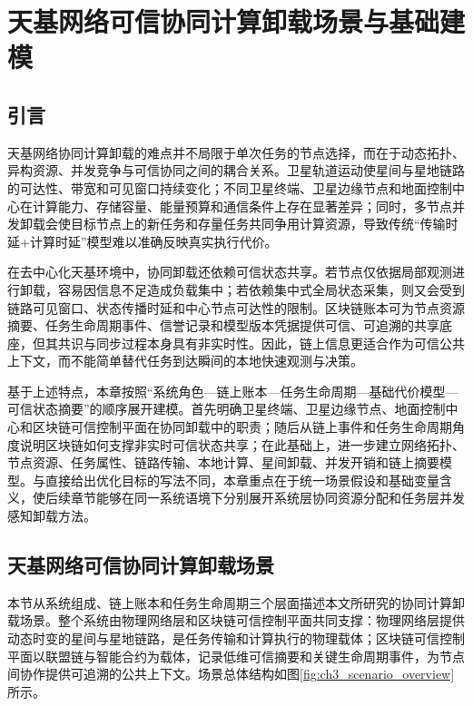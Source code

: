 
\chapter{天基网络可信协同计算卸载场景与基础建模}
\label{chap:ch3_unified_model}

\section{引言}
\label{sec:ch3_intro}

天基网络协同计算卸载的难点并不局限于单次任务的节点选择，而在于动态拓扑、异构资源、并发竞争与可信协同之间的耦合关系。卫星轨道运动使星间与星地链路的可达性、带宽和可见窗口持续变化；不同卫星终端、卫星边缘节点和地面控制中心在计算能力、存储容量、能量预算和通信条件上存在显著差异；同时，多节点并发卸载会使目标节点上的新任务和存量任务共同争用计算资源，导致传统``传输时延+计算时延''模型难以准确反映真实执行代价。

在去中心化天基环境中，协同卸载还依赖可信状态共享。若节点仅依据局部观测进行卸载，容易因信息不足造成负载集中；若依赖集中式全局状态采集，则又会受到链路可见窗口、状态传播时延和中心节点可达性的限制。区块链账本可为节点资源摘要、任务生命周期事件、信誉记录和模型版本凭据提供可信、可追溯的共享底座，但其共识与同步过程本身具有非实时性。因此，链上信息更适合作为可信公共上下文，而不能简单替代任务到达瞬间的本地快速观测与决策。

基于上述特点，本章按照``系统角色—链上账本—任务生命周期—基础代价模型—可信状态摘要''的顺序展开建模。首先明确卫星终端、卫星边缘节点、地面控制中心和区块链可信控制平面在协同卸载中的职责；随后从链上事件和任务生命周期角度说明区块链如何支撑非实时可信状态共享；在此基础上，进一步建立网络拓扑、节点资源、任务属性、链路传输、本地计算、星间卸载、并发开销和链上摘要模型。与直接给出优化目标的写法不同，本章重点在于统一场景假设和基础变量含义，使后续章节能够在同一系统语境下分别展开系统层协同资源分配和任务层并发感知卸载方法。

\section{天基网络可信协同计算卸载场景}
\label{sec:ch3_scenario}
\label{subsec:ch3_blockchain_role}

本节从系统组成、链上账本和任务生命周期三个层面描述本文所研究的协同计算卸载场景。整个系统由物理网络层和区块链可信控制平面共同支撑：物理网络层提供动态时变的星间与星地链路，是任务传输和计算执行的物理载体；区块链可信控制平面以联盟链与智能合约为载体，记录低维可信摘要和关键生命周期事件，为节点间协作提供可追溯的公共上下文。场景总体结构如图\ref{fig:ch3_scenario_overview}所示。

